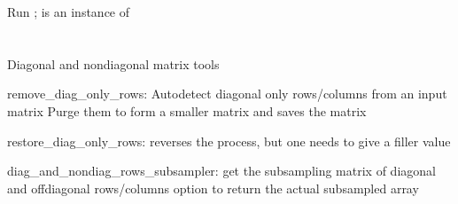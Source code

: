 \documentclass[letterpaper,10pt,english]{sphinxmanual}
\begin{document}
\begin{fulllineitems}
\begin{fulllineitems}
\label{\detokenize{kalman:glomar_gridding.autoregressive_kalman.KalmanOutUncorrCorrSplit.predict_uncorr}}
\pysigstartsignatures
\pysiglinewithargsret
{}
{}
{}
\pysigstopsignatures
\sphinxAtStartPar
Run ;
 is an instance of 

\end{fulllineitems}


\end{fulllineitems}



\section{}
\label{\detokenize{kalman:module-glomar_gridding.autoregressive_kalman.cov_diagonal}}\label{\detokenize{kalman:autoregressive-kalman-cov-diagonal}}
\sphinxAtStartPar
Diagonal and non\sphinxhyphen{}diagonal matrix tools

\sphinxAtStartPar
remove\_diag\_only\_rows:
\sphinxhyphen{} Auto\sphinxhyphen{}detect diagonal only rows/columns from an input matrix
\sphinxhyphen{} Purge them to form a smaller matrix and saves the matrix

\sphinxAtStartPar
restore\_diag\_only\_rows:
\sphinxhyphen{} reverses the process, but one needs to give a filler value

\sphinxAtStartPar
diag\_and\_nondiag\_rows\_subsampler:
\sphinxhyphen{} get the subsampling matrix of diagonal and off\sphinxhyphen{}diagonal rows/columns
\sphinxhyphen{} option to return the actual subsampled array
\end{document}
